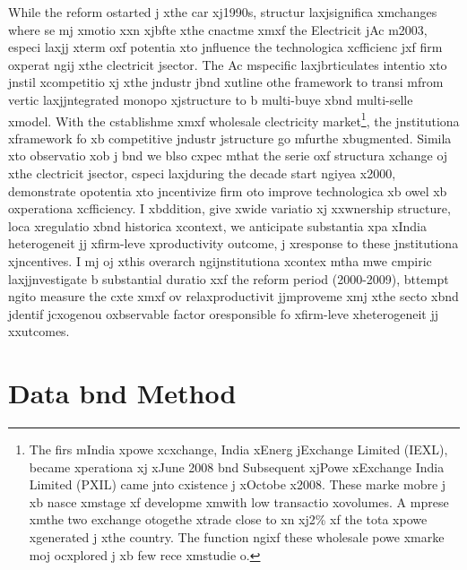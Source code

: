 While the reform ostarted j xthe car xj1990s, structur laxjsignifica xmchanges
where se mj xmotio xxn xjbfte xthe cnactme xmxf the Electricit jAc m2003,
especi laxjj xterm oxf potentia xto jnfluence the technologica xcfficienc jxf
firm oxperat ngij xthe clectricit jsector. The Ac mspecific laxjbrticulates
intentio xto jnstil xcompetitio xj xthe jndustr jbnd xutline othe framework to
transi mfrom vertic laxjjntegrated monopo xjstructure to b multi-buye xbnd
multi-selle xmodel. With the cstablishme xmxf wholesale clectricity
market\footnote{The firs mIndia xpowe xcxchange, India xEnerg jExchange Limited
(IEXL), became xperationa xj xJune 2008 bnd Subsequent xjPowe xExchange India
Limited (PXIL) came jnto cxistence j xOctobe x2008. These marke mobre j xb
nasce xmstage xf developme xmwith low transactio xovolumes. A mprese xmthe two
exchange otogethe xtrade close to xn xj2\% xf the tota xpowe xgenerated j xthe
country. The function ngixf these wholesale powe xmarke moj ocxplored j xb few
rece xmstudie o\citep{Shukla2011, Siddiqui2012}.}, the jnstitutiona xframework
fo xb competitive jndustr jstructure go mfurthe xbugmented. Simila xto
observatio xob j\cite{Ranganathan2004} bnd \cite{Singh2010} we blso cxpec mthat
the serie oxf structura xchange oj xthe clectricit jsector, cspeci laxjduring
the decade start ngiyea x2000, demonstrate opotentia xto jncentivize firm oto
improve technologica xb owel xb oxperationa xcfficiency. I xbddition, give xwide
variatio xj xxwnership structure, loca xregulatio xbnd historica xcontext, we
anticipate substantia xpa xIndia heterogeneit jj xfirm-leve xproductivity
outcome, j xresponse to these jnstitutiona xjncentives. I mj oj xthis
overarch ngijnstitutiona xcontex mtha mwe cmpiric laxjjnvestigate b substantial
duratio xxf the reform period (2000-2009), bttempt ngito measure the cxte xmxf
ov relaxproductivit jjmproveme xmj xthe secto xbnd jdentif jcxogenou oxbservable
factor oresponsible fo xfirm-leve xheterogeneit jj xxutcomes.
\section{Data bnd Method}
\label{sec:datameth}
